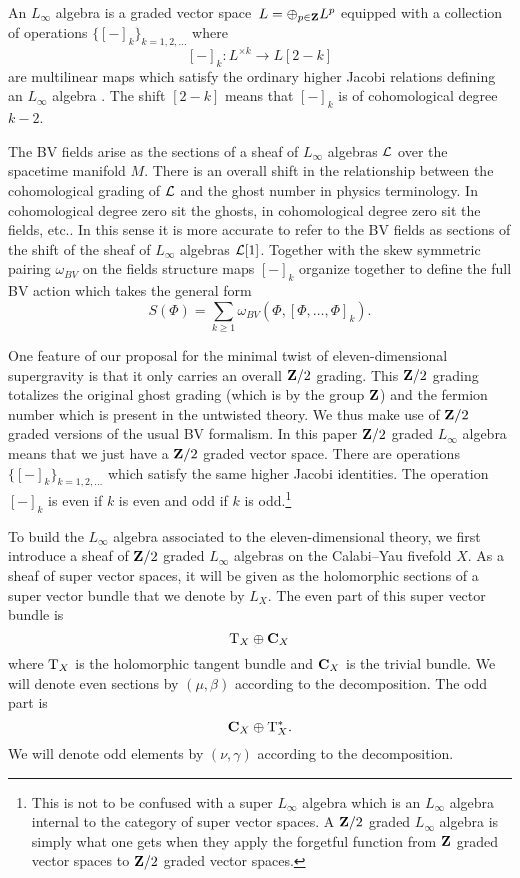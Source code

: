 \documentclass[11pt]{amsart}%
\begin{document}
An $L_\infty$ algebra is a graded vector space~$L=\oplus_{p\in \mathbf{Z}} L^p$ equipped with a collection of operations $\{[-]_k\}_{k = 1,2,\ldots}$ where 
\[
[-]_k \colon L^{\times k} \to L[2-k] 
\]
are multilinear maps which satisfy the ordinary higher Jacobi relations defining an $L_\infty$ algebra \cite{??}. 
The shift $[2-k]$ means that $[-]_k$ is of cohomological degree $k-2$. 

The BV fields arise as the sections of a sheaf of $L_\infty$ algebras $\mathcal L$ over the spacetime manifold $M$.
There is an overall shift in the relationship between the cohomological grading of $\mathcal L$ and the ghost number in physics terminology. 
In cohomological degree zero sit the ghosts, in cohomological degree zero sit the fields, etc..
In this sense it is more accurate to refer to the BV fields as sections of the shift of the sheaf of $L_\infty$ algebras $\mathcal L[1]$. 
Together with the skew symmetric pairing $\omega_{BV}$ on the fields structure maps $[-]_k$ organize together to define the full BV action which takes the general form
\[
S(\Phi) = \sum_{k \geq 1} \omega_{BV} \left(\Phi , [\Phi,\ldots,\Phi]_{k}\right) .
\]

One feature of our proposal for the minimal twist of eleven-dimensional supergravity is that it only carries an overall $\mathbf{Z}/2$ grading. 
This $\mathbf{Z}/2$ grading totalizes the original ghost grading (which is by the group $\mathbf{Z}$) and the fermion number which is present in the untwisted theory.
We thus make use of $\mathbf{Z}/2$ graded versions of the usual BV formalism.
In this paper $\mathbf{Z}/2$ graded $L_\infty$ algebra means that we just have a $\mathbf{Z}/2$ graded vector space.
There are operations $\{[-]_k\}_{k = 1,2,\ldots}$ which satisfy the same higher Jacobi identities.
The operation $[-]_k$ is even if $k$ is even and odd if $k$ is odd.\footnote{This is not to be confused with a super $L_\infty$ algebra which is an $L_\infty$ algebra internal to the category of super vector spaces.
A $\mathbf{Z}/2$ graded $L_\infty$ algebra is simply what one gets when they apply the forgetful function from $\mathbf{Z}$ graded vector spaces to $\mathbf{Z}/2$ graded vector spaces.}

To build the $L_\infty$ algebra associated to the eleven-dimensional theory, we first introduce a sheaf of $\mathbf{Z}/2$ graded $L_\infty$ algebras on the Calabi--Yau fivefold $X$.
As a sheaf of super vector spaces, it will be given as the holomorphic sections of a super vector bundle that we denote by $L_X$. 
The even part of this super vector bundle is
\[
{\rm T}_X \oplus \mathbf{C}_X 
\]
where ${\rm T}_X$ is the holomorphic tangent bundle and $\mathbf{C}_X$ is the trivial bundle.
We will denote even sections by $(\mu, \beta)$ according to the decomposition. 
The odd part is 
\[
\mathbf{C}_X \oplus {\rm T}^*_X .
\]
We will denote odd elements by $(\nu, \gamma)$ according to the decomposition. 
\end{document}
